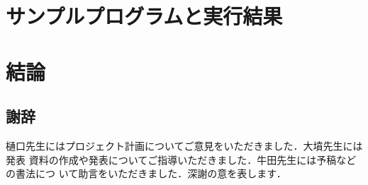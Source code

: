 \documentclass[a4paper,titlepage,report]{jsbook}
\begin{document}
\chapter{サンプルプログラムと実行結果}\label{ch:sample-program}

\chapter{結論}\label{ch:conclude}

\section*{謝辞}
樋口先生にはプロジェクト計画についてご意見をいただきました．大墳先生には発表
資料の作成や発表についてご指導いただきました．牛田先生には予稿などの書法につ
いて助言をいただきました．深謝の意を表します．




\backmatter
\appendix
\end{document}
